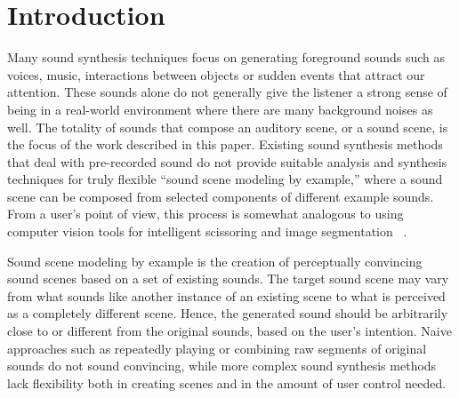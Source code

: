 \documentclass{acmsiggraph}               %
\begin{document}


\keywordlist

\section{Introduction}
Many sound synthesis techniques focus on generating foreground sounds 
such as voices, music, interactions between objects or sudden events that 
attract our attention. These sounds alone do not generally give the listener 
a strong sense of being in a real-world environment where there are many 
background noises as well. The totality of sounds that compose an auditory 
scene, or a sound scene, is the focus of the work described in this paper.  
Existing sound synthesis methods that deal with pre-recorded sound do not 
provide suitable analysis and synthesis techniques for truly flexible ``sound 
scene modeling by example,'' where a sound scene can be composed from selected 
components of different example sounds. 
From a user's point of view, this process is somewhat analogous to 
using computer vision tools for intelligent scissoring and image 
segmentation ~\cite{Mortensen95,Drori03,Rother04,Wang05}.

Sound scene modeling by example is the creation of perceptually convincing 
sound scenes based on a set of existing sounds. The target sound scene 
may vary from what sounds like another instance of an existing scene to 
what is perceived as a completely different scene. Hence, the generated sound 
should be arbitrarily close to or different from the original sounds, based on 
the user's intention. Naive approaches such as repeatedly playing or combining 
raw segments of original sounds do not sound convincing, while more complex 
sound synthesis methods lack flexibility both in creating scenes and in the 
amount of user control needed.
\end{document}
